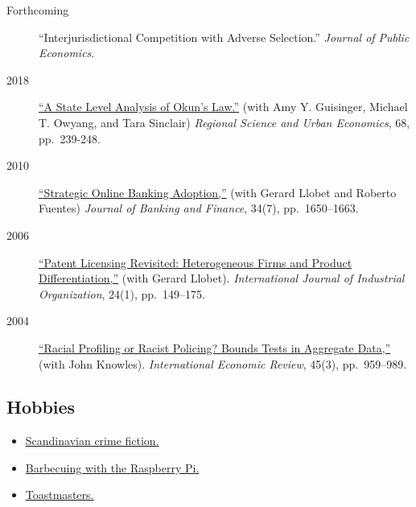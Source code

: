 \documentclass[10pt,]{article}
\def\tightlist{}
\begin{document}
\begin{description}
\tightlist
\item[Forthcoming]
``Interjurisdictional Competition with Adverse Selection.''
\emph{Journal of Public Economics}.
\item[2018]
\href{https://doi.org/10.1016/j.regsciurbeco.2017.11.005}{``A State
Level Analysis of Okun's Law.''} (with Amy Y. Guisinger, Michael T.
Owyang, and Tara Sinclair) \emph{Regional Science and Urban Economics},
68, pp.~239-248.
\item[2010]
\href{http://dx.doi.org/10.1016/j.jbankfin.2010.03.011}{``Strategic
Online Banking Adoption,''} (with Gerard Llobet and Roberto Fuentes)
\emph{Journal of Banking and Finance}, 34(7), pp.~1650--1663.
\item[2006]
\href{http://dx.doi.org/10.1016/j.ijindorg.2005.03.008}{``Patent
Licensing Revisited: Heterogeneous Firms and Product Differentiation,''}
(with Gerard Llobet). \emph{International Journal of Industrial
Organization}, 24(1), pp.~149--175.
\item[2004]
\href{http://dx.doi.org/10.1111/j.0020-6598.2004.00293.x}{``Racial
Profiling or Racist Policing? Bounds Tests in Aggregate Data,''} (with
John Knowles). \emph{International Economic Review}, 45(3),
pp.~959--989.
\end{description}

\hypertarget{hobbies}{%
\subsection{Hobbies}\label{hobbies}}

\begin{itemize}
\tightlist
\item
  \href{https://en.wikipedia.org/wiki/Scandinavian_noir}{Scandinavian
  crime fiction.}
\item
  \href{https://github.com/CapnBry/HeaterMeter/wiki}{Barbecuing with the
  Raspberry Pi.}
\item
  \href{https://www.toastmasters.org/}{Toastmasters.}
\end{itemize}
\end{document}
